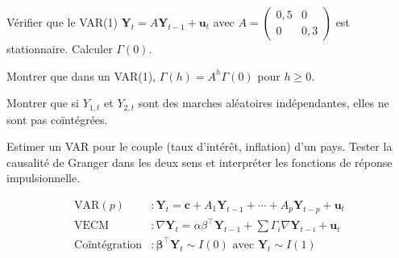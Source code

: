 \begin{exercice}[$\star$]
V\'erifier que le VAR(1) $\bm{Y}_t = A\bm{Y}_{t-1}+\bm{u}_t$ avec $A=\begin{pmatrix}0{,}5&0\\0&0{,}3\end{pmatrix}$ est stationnaire. Calculer $\Gamma(0)$.
\end{exercice}

\begin{exercice}[$\star\star$]
Montrer que dans un VAR(1), $\Gamma(h)=A^h\Gamma(0)$ pour $h\geq 0$.
\end{exercice}

\begin{exercice}[$\star\star$]
Montrer que si $Y_{1,t}$ et $Y_{2,t}$ sont des marches al\'eatoires ind\'ependantes, elles ne sont pas co\"int\'egr\'ees.
\end{exercice}

\begin{exercice}
Estimer un VAR pour le couple (taux d'int\'er\^et, inflation) d'un pays. Tester la causalit\'e de Granger dans les deux sens et interpr\'eter les fonctions de r\'eponse impulsionnelle.
\end{exercice}

\begin{formules}
\begin{align*}
\text{VAR}(p) &: \bm{Y}_t = \bm{c}+A_1\bm{Y}_{t-1}+\cdots+A_p\bm{Y}_{t-p}+\bm{u}_t \\
\text{VECM} &: \nabla\bm{Y}_t=\alpha\beta^\top\bm{Y}_{t-1}+\sum\Gamma_i\nabla\bm{Y}_{t-i}+\bm{u}_t \\
\text{Co\"int\'egration} &: \bm\beta^\top\bm{Y}_t\sim I(0)\text{ avec }\bm{Y}_t\sim I(1)
\end{align*}
\end{formules}
